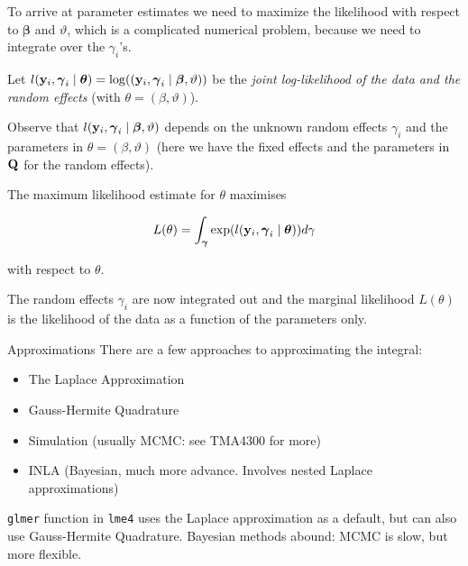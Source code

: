 \documentclass[
  ignorenonframetext,
]{beamer}
\providecommand{\tightlist}{%
  \setlength{\itemsep}{0pt}\setlength{\parskip}{0pt}}
\begin{document}
\begin{frame}
To arrive at parameter estimates we need to maximize the likelihood with
respect to \({\boldsymbol \beta}\) and \(\vartheta\), which is a
complicated numerical problem, because we need to integrate over the
\(\gamma_i\)'s.

Let
\(l({\bf y}_i, \boldsymbol{\gamma}_i \mid {\boldsymbol \theta}) = \log(({\bf y}_i, \boldsymbol{\gamma}_i \mid {\boldsymbol \beta},\vartheta))\)
be the \emph{joint log-likelihood of the data and the random effects}
(with \(\theta = (\beta, \vartheta)\)).

Observe that
\(l({\bf y}_i, \boldsymbol{\gamma}_i \mid {\boldsymbol \beta},\vartheta)\)
depends on the unknown random effects \(\gamma_i\) and the parameters in
\(\theta = (\beta, \vartheta)\) (here we have the fixed effects and the
parameters in \({\bf Q}\) for the random effects).
\end{frame}

\begin{frame}
The maximum likelihood estimate for \(\theta\) maximises

\[
L(\theta)=\int_{\boldsymbol{\gamma}} \exp(l({\bf y}_i, \boldsymbol{\gamma}_i \mid {\boldsymbol \theta}))d\gamma
\]

with respect to \(\theta\).

The random effects \(\gamma_i\) are now integrated out and the marginal
likelihood \(L(\theta)\) is the likelihood of the data as a function of
the parameters only.
\end{frame}

\begin{frame}[fragile]
\begin{block}{Approximations}
\protect{}\label{approximations}
There are a few approaches to approximating the integral:

\begin{itemize}
\tightlist
\item
  The Laplace Approximation
\item
  Gauss-Hermite Quadrature
\item
  Simulation (usually MCMC: see TMA4300 for more)
\item
  INLA (Bayesian, much more advance. Involves nested Laplace
  approximations)
\end{itemize}

\texttt{glmer} function in \texttt{lme4} uses the Laplace approximation
as a default, but can also use Gauss-Hermite Quadrature. Bayesian
methods abound: MCMC is slow, but more flexible.
\end{block}
\end{frame}
\end{document}
